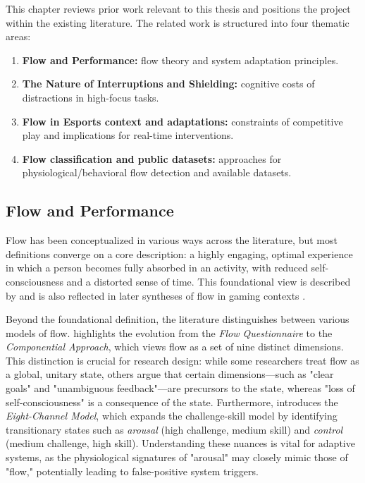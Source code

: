 This chapter reviews prior work relevant to this thesis and positions the project within the existing literature. The related work is structured into four thematic areas:

\begin{enumerate}
    \item \textbf{Flow and Performance:} flow theory and system adaptation principles.
    \item \textbf{The Nature of Interruptions and Shielding:} cognitive costs of distractions in high-focus tasks.
    \item \textbf{Flow in Esports context and adaptations:} constraints of competitive play and implications for real-time interventions.
    \item \textbf{Flow classification and public datasets:} approaches for physiological/behavioral flow detection and available datasets.
\end{enumerate}

\subsection{Flow and Performance}
Flow has been conceptualized in various ways across the literature, but most definitions converge on a core description: a highly engaging, optimal experience in which a person becomes fully absorbed in an activity, with reduced self-consciousness and a distorted sense of time. This foundational view is described by \textcite{inbook} and is also reflected in later syntheses of flow in gaming contexts \autocite{nah2014flow}.

Beyond the foundational definition, the literature distinguishes between various models of flow. \textcite{Moneta2012} highlights the evolution from the \textit{Flow Questionnaire} to the \textit{Componential Approach}, which views flow as a set of nine distinct dimensions. This distinction is crucial for research design: while some researchers treat flow as a global, unitary state, others argue that certain dimensions—such as "clear goals" and "unambiguous feedback"—are precursors to the state, whereas "loss of self-consciousness" is a consequence of the state. Furthermore, \textcite{Moneta2012} introduces the \textit{Eight-Channel Model}, which expands the challenge-skill model by identifying transitionary states such as \textit{arousal} (high challenge, medium skill) and \textit{control} (medium challenge, high skill). Understanding these nuances is vital for adaptive systems, as the physiological signatures of "arousal" may closely mimic those of "flow," potentially leading to false-positive system triggers.

